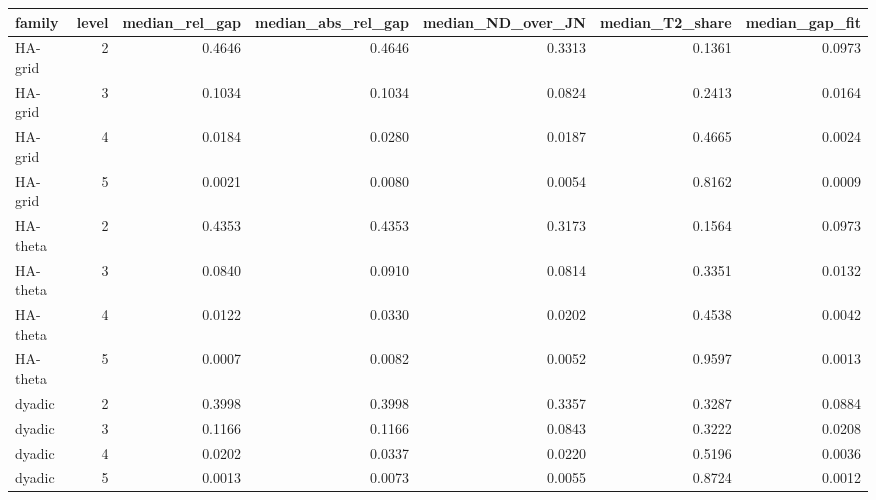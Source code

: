 \begin{tabular}{lrrrrrr}
\toprule
family & level & median_rel_gap & median_abs_rel_gap & median_ND_over_JN & median_T2_share & median_gap_fit \\
\midrule
HA-grid & 2 & 0.4646 & 0.4646 & 0.3313 & 0.1361 & 0.0973 \\
HA-grid & 3 & 0.1034 & 0.1034 & 0.0824 & 0.2413 & 0.0164 \\
HA-grid & 4 & 0.0184 & 0.0280 & 0.0187 & 0.4665 & 0.0024 \\
HA-grid & 5 & 0.0021 & 0.0080 & 0.0054 & 0.8162 & 0.0009 \\
HA-theta & 2 & 0.4353 & 0.4353 & 0.3173 & 0.1564 & 0.0973 \\
HA-theta & 3 & 0.0840 & 0.0910 & 0.0814 & 0.3351 & 0.0132 \\
HA-theta & 4 & 0.0122 & 0.0330 & 0.0202 & 0.4538 & 0.0042 \\
HA-theta & 5 & 0.0007 & 0.0082 & 0.0052 & 0.9597 & 0.0013 \\
dyadic & 2 & 0.3998 & 0.3998 & 0.3357 & 0.3287 & 0.0884 \\
dyadic & 3 & 0.1166 & 0.1166 & 0.0843 & 0.3222 & 0.0208 \\
dyadic & 4 & 0.0202 & 0.0337 & 0.0220 & 0.5196 & 0.0036 \\
dyadic & 5 & 0.0013 & 0.0073 & 0.0055 & 0.8724 & 0.0012 \\
\bottomrule
\end{tabular}
